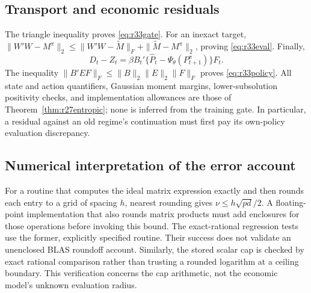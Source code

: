 \subsection{Transport and economic residuals}
The triangle inequality proves \eqref{eq:r33gate}. For an inexact target,
$\|W'W-M^\pi\|_2\leq\|W'W-\widetilde M\|_F+
\|\widetilde M-M^\pi\|_2$, proving \eqref{eq:r33eval}.
Finally,
\[
 D_t-Z_t=\beta B_t'\{\widehat P_t-\Psi_\theta(P_{t+1}^\pi)\}F_t.
\]
The inequality $\|B'EF\|_F\leq\|B\|_2\|E\|_2\|F\|_F$ proves
\eqref{eq:r33policy}. All state and action quantifiers, Gaussian moment
margins, lower-subsolution positivity checks, and implementation allowances
are those of Theorem~\ref{thm:r27entropic}; none is inferred from the
training gate. In particular, a residual against an old regime's continuation
must first pay its own-policy evaluation discrepancy.

\subsection{Numerical interpretation of the error account}
For a routine that computes the ideal matrix expression exactly and then
rounds each entry to a grid of spacing $h$, nearest rounding gives
$\nu\leq h\sqrt{pd}/2$. A floating-point implementation that also rounds
matrix products must add enclosures for those operations before invoking
this bound. The exact-rational regression tests use the former, explicitly
specified routine. Their success does not validate an unenclosed BLAS
roundoff account. Similarly, the stored scalar cap is checked by exact
rational comparison rather than trusting a rounded logarithm at a ceiling
boundary. This verification concerns the cap arithmetic, not the economic
model's unknown evaluation radius.
